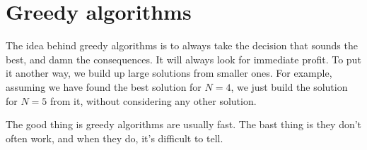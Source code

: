\section{Greedy algorithms}

The idea behind greedy algorithms is to always take the decision
that sounds the best, and damn the consequences.
It will always look for immediate profit.
To put it another way, we build up large solutions from smaller ones.
For example, assuming we have found the best solution for $N=4$,
we just build the solution for $N=5$ from it, without considering any other
solution.

The good thing is greedy algorithms are usually fast.
The bast thing is they don't often work,
and when they do, it's difficult to tell.



